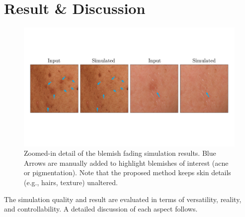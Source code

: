 
\chapter{Result \& Discussion}
\begin{spacing}{1.5}
\setlength{\parskip}{0.3in}
\begin{figure}[h]
    \centering
    \includegraphics[width=0.9\linewidth]{Chapter5/img_comp2.pdf}
    \caption{Zoomed-in detail of the blemish fading simulation results. Blue Arrows are manually added to highlight blemishes of interest (acne or pigmentation). Note that the proposed method keeps skin details (e.g., hairs, texture) unaltered.}
    \label{fig:sim2}
\end{figure}
The simulation quality and result are evaluated in terms of versatility, reality, and controllability. A detailed discussion of each aspect follows.


\end{spacing}
